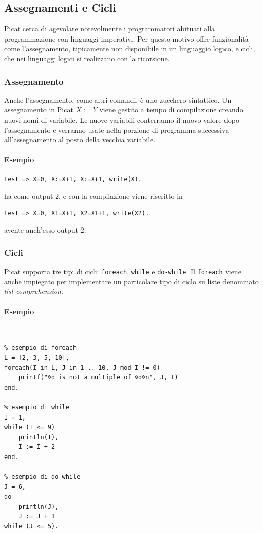 \documentclass[12pt,a4paper,openright]{book} %
\begin{document}
\subsection{Assegnamenti e Cicli}
\label{subsec:picat_base_asscycle}

Picat cerca di agevolare notevolmente i programmatori abituati alla
programmazione con linguaggi imperativi. Per questo motivo offre
funzionalità come l'assegnamento, tipicamente non disponibile in un
linguaggio logico, e cicli, che nei linguaggi logici si realizzano con
la ricorsione.

\subsubsection{Assegnamento}

Anche l'assegnamento, come altri comandi, è uno zucchero
sintattico. Un assegnamento in Picat $X := Y$ viene gestito a tempo di
compilazione creando nuovi nomi di variabile. Le nuove variabili
conterranno il nuovo valore dopo l'assegnamento e verranno usate nella
porzione di programma successiva all'assegnamento al posto della
vecchia variabile.

\paragraph{Esempio}
\begin{verbatim}
test => X=0, X:=X+1, X:=X+1, write(X).
\end{verbatim}
ha come output $2$, e con la compilazione viene riscritto in
\begin{verbatim}
test => X=0, X1=X+1, X2=X1+1, write(X2).
\end{verbatim}
avente anch'esso output $2$.

\subsubsection{Cicli}

Picat supporta tre tipi di cicli: \verb|foreach|, \verb|while| e
\verb|do-while|. Il \verb|foreach| viene anche impiegato per
implementare un particolare tipo di ciclo su liste denominato
\emph{list comprehension}.

\paragraph{Esempio}\
\begin{lstlisting}
% esempio di foreach
L = [2, 3, 5, 10],
foreach(I in L, J in 1 .. 10, J mod I != 0)
	printf("%d is not a multiple of %d%n", J, I)
end.

% esempio di while
I = 1,
while (I <= 9)
	println(I),
	I := I + 2
end.

% esempio di do while
J = 6,
do
	println(J),
	J := J + 1
while (J <= 5).
\end{lstlisting}
\end{document}
